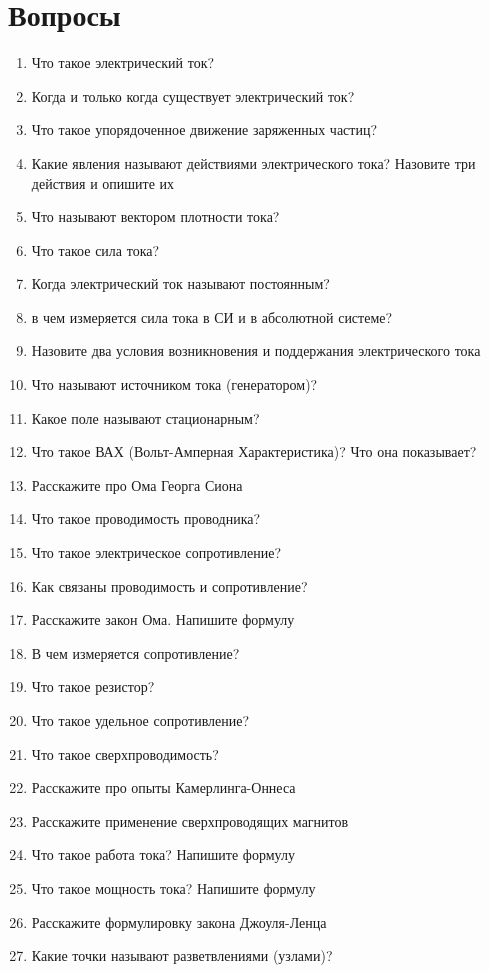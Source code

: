 \documentclass[12pt,a4paper]{report}
\begin{document}
\section{Вопросы}
\begin{enumerate}
\item Что такое электрический ток?
\item Когда и только когда существует электрический ток?
\item Что такое упорядоченное движение заряженных частиц?
\item Какие явления называют действиями электрического тока? Назовите три действия и опишите их
\item Что называют вектором плотности тока?
\item Что такое сила тока?
\item Когда электрический ток называют постоянным?
\item в чем измеряется сила тока в СИ и в абсолютной системе?
\item Назовите два условия возникновения и поддержания электрического тока
\item Что называют источником тока (генератором)?
\item Какое поле называют стационарным?
\item Что такое ВАХ (Вольт-Амперная Характеристика)? Что она показывает?
\item Расскажите про Ома Георга Сиона
\item Что такое проводимость проводника?
\item Что такое электрическое сопротивление?
\item Как связаны проводимость и сопротивление?
\item Расскажите закон Ома. Напишите формулу
\item В чем измеряется сопротивление?
\item Что такое резистор?
\item Что такое удельное сопротивление?
\item Что такое сверхпроводимость?
\item Расскажите про опыты Камерлинга-Оннеса
\item Расскажите применение сверхпроводящих магнитов
\item Что такое работа тока? Напишите формулу
\item Что такое мощность тока? Напишите формулу
\item Расскажите формулировку закона Джоуля-Ленца
\item Какие точки называют разветвлениями (узлами)?

\end{enumerate}
\end{document}
